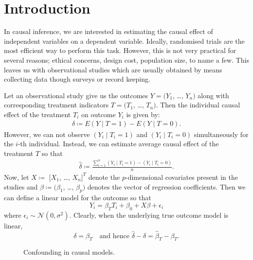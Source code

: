 \documentclass{amsart}
\begin{document}
\section{Introduction}\label{sec:intro}

In causal inference, we are interested in estimating the causal
effect of independent variables on a dependent variable. Ideally,
randomised trials are the most efficient way to perform this task.
However, this is not very practical for several reasons; ethical 
concerns, design cost, population size, to name a few. This
leaves us with observational studies which are usually obtained
by means collecting data though surveys or record keeping. 

Let an observational study give us the outcomes $Y=(Y_1$, \dots, $Y_n)$ along with 
corresponding treatment indicators $T=(T_1$, \dots, $T_n)$. Then the
individual causal
effect of the treatment $T_i$ on outcome $Y_i$ is given by:
\begin{align}
\delta \coloneqq E(Y\mid T=1) - E(Y\mid T=0).
\end{align}
However, we can not observe $(Y_i\mid T_i=1)$ and $(Y_i\mid T_i=0)$
simultaneously for the $i$-th individual. Instead, we can estimate
average causal effect of the treatment $T$ so that
\begin{align}
\hat{\delta} \coloneqq 
\frac{\sum_{i=1}^n(Y_i\mid T_i=1) - (Y_i\mid T_i=0)}{n}.
\end{align}
Now, let $X\coloneqq$ $[X_1$, \dots, $X_n]^T$ 
denote the $p$-dimensional covariates present in the studies and $\beta \coloneqq (\beta_1$, \dots, $\beta_p)$ denotes the vector of regression
coefficients. Then we can define a linear model for the outcome
so that
\begin{equation}
    Y_i = \beta_{T} T_i + \beta_0 + X\beta + \epsilon_i
\end{equation}
where $\epsilon_i\sim \mathcal{N}(0, \sigma^2)$. Clearly, when
the underlying true outcome model is linear,
\begin{equation}
    \delta = \beta_{T}\quad\text{and hence } 
    \hat{\delta} - \delta = \hat{\beta}_T - \beta_T.
\end{equation}

\begin{figure}
    \centering
\caption{Confounding in causal models.}
    \label{fig:my_label}
\end{figure}
\end{document}
